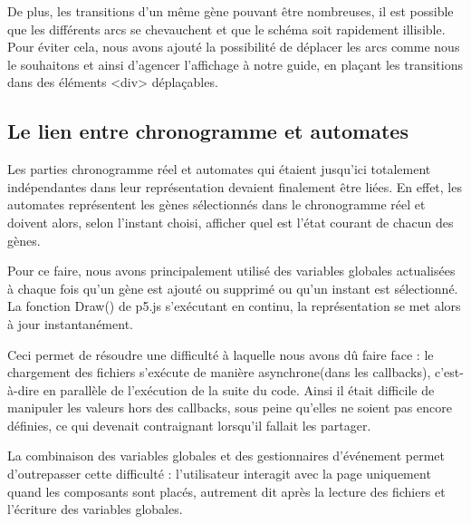 De plus, les transitions d'un même gène pouvant être nombreuses, il est possible que les différents arcs se chevauchent et que le schéma soit rapidement illisible. Pour éviter cela, nous avons ajouté la possibilité de déplacer les arcs comme nous le souhaitons et ainsi d'agencer l'affichage à notre guide, en plaçant les transitions dans des éléments <div> déplaçables. 



\bigbreak

\subsection{Le lien entre chronogramme et automates}

\bigbreak

Les parties chronogramme réel et automates qui étaient jusqu’ici totalement indépendantes dans leur représentation devaient finalement être liées. En effet, les automates représentent les gènes sélectionnés dans le chronogramme réel et doivent alors, selon l’instant choisi, afficher quel est l’état courant de chacun des gènes. 

Pour ce faire, nous avons principalement utilisé des variables globales actualisées à chaque fois qu’un gène est ajouté ou supprimé ou qu’un instant est sélectionné. La fonction Draw() de p5.js s’exécutant en continu, la représentation se met alors à jour instantanément.

Ceci permet de résoudre une difficulté à laquelle nous avons dû faire face : le chargement des fichiers s’exécute de manière asynchrone(dans les callbacks), c’est-à-dire en parallèle de l’exécution de la suite du code. Ainsi il était difficile de manipuler les valeurs hors des callbacks, sous peine qu’elles ne soient pas encore définies, ce qui devenait contraignant lorsqu’il fallait les partager.

La combinaison des variables globales et des gestionnaires d’événement permet d’outrepasser cette difficulté : l’utilisateur interagit avec la page uniquement quand les composants sont placés, autrement dit après la lecture des fichiers et l’écriture des variables globales.

